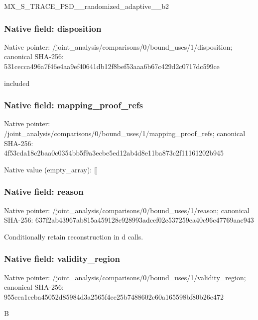 \documentclass[10pt,a4paper]{article}
\begin{document}
\begingroup\raggedright\sloppy MX\_\allowbreak{}S\_\allowbreak{}TRACE\_\allowbreak{}PSD\_\allowbreak{}\_\allowbreak{}randomized\_\allowbreak{}adaptive\_\allowbreak{}\_\allowbreak{}b2\par\endgroup

\subsubsection{Native field: disposition}
Native pointer: /joint\_\allowbreak{}analysis/comparisons/0/bound\_\allowbreak{}uses/1/disposition; canonical SHA-256: 531cecca496a7f46e4aa9ef40641db12f8bef53aaa6b67c429d2c0717dc599ce

\begingroup\raggedright\sloppy included\par\endgroup

\subsubsection{Native field: mapping\_\allowbreak{}proof\_\allowbreak{}refs}
Native pointer: /joint\_\allowbreak{}analysis/comparisons/0/bound\_\allowbreak{}uses/1/mapping\_\allowbreak{}proof\_\allowbreak{}refs; canonical SHA-256: 4f53cda18c2baa0c0354bb5f9a3ecbe5ed12ab4d8e11ba873c2f11161202b945

Native value (empty\_\allowbreak{}array): []

\subsubsection{Native field: reason}
Native pointer: /joint\_\allowbreak{}analysis/comparisons/0/bound\_\allowbreak{}uses/1/reason; canonical SHA-256: 637f2ab43967ab815a459128c928993adcef02c537259ea40c96c47769aac943

\begingroup\raggedright\sloppy Conditionally retain reconstruction in d calls.\par\endgroup

\subsubsection{Native field: validity\_\allowbreak{}region}
Native pointer: /joint\_\allowbreak{}analysis/comparisons/0/bound\_\allowbreak{}uses/1/validity\_\allowbreak{}region; canonical SHA-256: 955cca1ceba45052d85984d3a2565f4ce25b7488602c60a165598bf80b26e472

\begingroup\raggedright\sloppy B\par\endgroup
\end{document}

